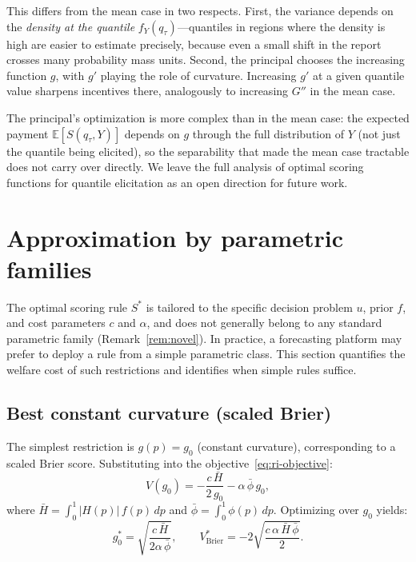 \documentclass[11pt]{article}
\begin{document}
This differs from the mean case in two respects. First, the variance depends on the \emph{density at the quantile} $f_Y(q_\tau)$---quantiles in regions where the density is high are easier to estimate precisely, because even a small shift in the report crosses many probability mass units. Second, the principal chooses the increasing function $g$, with $g'$ playing the role of curvature. Increasing $g'$ at a given quantile value sharpens incentives there, analogously to increasing $G''$ in the mean case.

The principal's optimization is more complex than in the mean case: the expected payment $\mathbb{E}[S(q_\tau, Y)]$ depends on $g$ through the full distribution of $Y$ (not just the quantile being elicited), so the separability that made the mean case tractable does not carry over directly. We leave the full analysis of optimal scoring functions for quantile elicitation as an open direction for future work.


\section{Approximation by parametric families}\label{sec:approximation}

The optimal scoring rule $S^*$ is tailored to the specific decision problem $u$, prior $f$, and cost parameters $c$ and $\alpha$, and does not generally belong to any standard parametric family (Remark~\ref{rem:novel}). In practice, a forecasting platform may prefer to deploy a rule from a simple parametric class. This section quantifies the welfare cost of such restrictions and identifies when simple rules suffice.

\subsection{Best constant curvature (scaled Brier)}

The simplest restriction is $g(p) = g_0$ (constant curvature), corresponding to a scaled Brier score. Substituting into the objective~\eqref{eq:ri-objective}:
\[
V(g_0) = -\frac{c\,\bar{H}}{2\,g_0} - \alpha\,\bar{\phi}\,g_0,
\]
where $\bar{H} = \int_0^1 |H(p)|\,f(p)\,dp$ and $\bar{\phi} = \int_0^1 \phi(p)\,dp$. Optimizing over $g_0$ yields:
\begin{equation}\label{eq:best-brier}
g_0^* = \sqrt{\frac{c\,\bar{H}}{2\alpha\,\bar{\phi}}}, \qquad V^*_{\mathrm{Brier}} = -2\sqrt{\frac{c\,\alpha\,\bar{H}\,\bar{\phi}}{2}}.
\end{equation}
\end{document}
